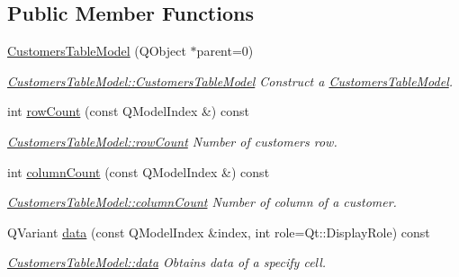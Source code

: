 \subsection*{Public Member Functions}
\begin{DoxyCompactItemize}
\item 
\hyperlink{classGui_1_1Widgets_1_1WdgModels_1_1CustomersTableModel_a51344d4c37da74da6527e7a41e9fff6b}{Customers\+Table\+Model} (Q\+Object $\ast$parent=0)
\begin{DoxyCompactList}\small\item\em \hyperlink{classGui_1_1Widgets_1_1WdgModels_1_1CustomersTableModel_a51344d4c37da74da6527e7a41e9fff6b}{Customers\+Table\+Model\+::\+Customers\+Table\+Model} Construct a \hyperlink{classGui_1_1Widgets_1_1WdgModels_1_1CustomersTableModel}{Customers\+Table\+Model}. \end{DoxyCompactList}\item 
int \hyperlink{classGui_1_1Widgets_1_1WdgModels_1_1CustomersTableModel_a872cf3156efd50f6d03f8700aa502962}{row\+Count} (const Q\+Model\+Index \&) const 
\begin{DoxyCompactList}\small\item\em \hyperlink{classGui_1_1Widgets_1_1WdgModels_1_1CustomersTableModel_a872cf3156efd50f6d03f8700aa502962}{Customers\+Table\+Model\+::row\+Count} Number of customers row. \end{DoxyCompactList}\item 
int \hyperlink{classGui_1_1Widgets_1_1WdgModels_1_1CustomersTableModel_a50a7dd6359eadce3011d86f0aa3b0362}{column\+Count} (const Q\+Model\+Index \&) const 
\begin{DoxyCompactList}\small\item\em \hyperlink{classGui_1_1Widgets_1_1WdgModels_1_1CustomersTableModel_a50a7dd6359eadce3011d86f0aa3b0362}{Customers\+Table\+Model\+::column\+Count} Number of column of a customer. \end{DoxyCompactList}\item 
Q\+Variant \hyperlink{classGui_1_1Widgets_1_1WdgModels_1_1CustomersTableModel_a56f0da4118917c722bc27eb907e7e5fa}{data} (const Q\+Model\+Index \&index, int role=Qt\+::\+Display\+Role) const 
\begin{DoxyCompactList}\small\item\em \hyperlink{classGui_1_1Widgets_1_1WdgModels_1_1CustomersTableModel_a56f0da4118917c722bc27eb907e7e5fa}{Customers\+Table\+Model\+::data} Obtains data of a specify cell. \end{DoxyCompactList}\item 

\end{DoxyCompactItemize}
